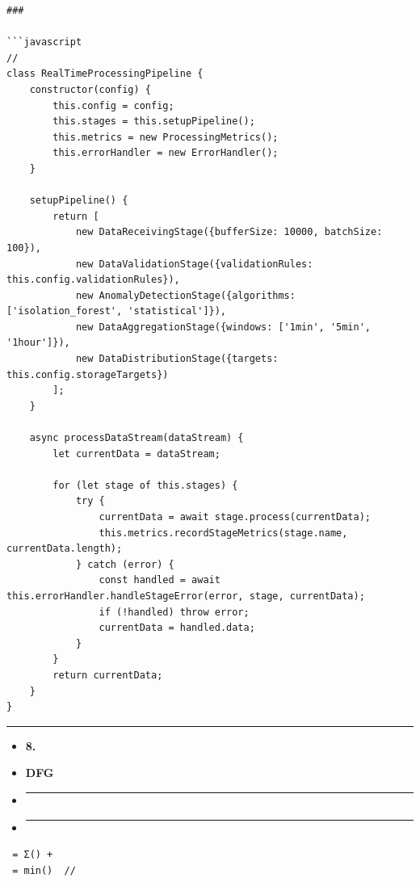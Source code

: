 \begin{verbatim}
### 

```javascript
// 
class RealTimeProcessingPipeline {
    constructor(config) {
        this.config = config;
        this.stages = this.setupPipeline();
        this.metrics = new ProcessingMetrics();
        this.errorHandler = new ErrorHandler();
    }
    
    setupPipeline() {
        return [
            new DataReceivingStage({bufferSize: 10000, batchSize: 100}),
            new DataValidationStage({validationRules: this.config.validationRules}),
            new AnomalyDetectionStage({algorithms: ['isolation_forest', 'statistical']}),
            new DataAggregationStage({windows: ['1min', '5min', '1hour']}),
            new DataDistributionStage({targets: this.config.storageTargets})
        ];
    }
    
    async processDataStream(dataStream) {
        let currentData = dataStream;
        
        for (let stage of this.stages) {
            try {
                currentData = await stage.process(currentData);
                this.metrics.recordStageMetrics(stage.name, currentData.length);
            } catch (error) {
                const handled = await this.errorHandler.handleStageError(error, stage, currentData);
                if (!handled) throw error;
                currentData = handled.data;
            }
        }
        return currentData;
    }
}
\end{verbatim}

\begin{center}\rule{0.5\linewidth}{0.5pt}\end{center}

\begin{itemize}
\item
  \textbf{8. }
\item
  \textbf{DFG}
\item
  \begin{center}\rule{0.5\linewidth}{0.5pt}\end{center}
\item
  \begin{center}\rule{0.5\linewidth}{0.5pt}\end{center}
\end{itemize}

\begin{verbatim}
 = Σ() + 
 = min()  // 
\end{verbatim}

